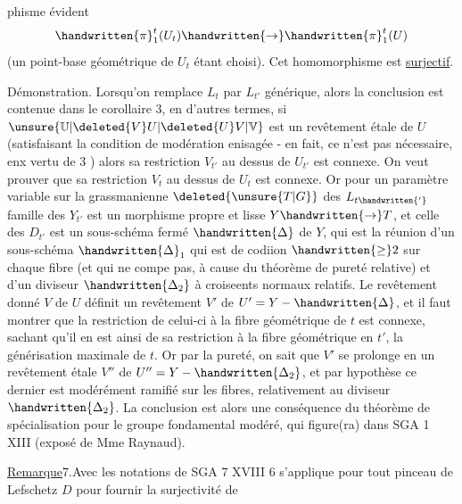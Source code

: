 phisme évident
\[
\handwritten{\pi}_1^t(U_t)\handwritten{\rightarrow}\handwritten{\pi}_1^t(U)
\]
(un point-base géométrique de $U_t$ étant choisi). Cet homomorphisme est \uline{surjectif}.

Démonstration. Lorsqu'on remplace $L_t$ par $L_{t'}$ générique, alors la conclusion est contenue dans le corollaire 3, en d'autres termes, si $\unsure{\mathbb{U}|\deleted{V}U|\deleted{U}V|\mathbb{V}}$ est un revêtement étale  de $U$  (satisfaisant la condition de modération enisagée - en fait, ce n'est pas nécessaire, enx vertu de 3 ) alors sa restriction $V_{t'}$ au dessus de $U_{t'}$ est connexe. On veut prouver que sa restriction $V_t$ au dessus de $U_t$ est  connexe. Or pour un paramètre variable sur  la grassmanienne $\deleted{\unsure{T|G}}$ des $L_{t\handwritten{'}}$\handwritten{,}   famille des $Y_{t'}$ est un morphisme propre et lisse $Y\handwritten{\rightarrow}T$, et celle des $D_{t'}$ est un sous-schéma fermé  $\handwritten{\Delta}$ de $Y$, qui est la réunion d'un sous-schéma $\handwritten{\Delta}_1$ qui est de codiion $\handwritten{\geq}2$ sur chaque fibre (et qui ne compe pas, à cause du théorème de pureté relative) et d'un diviseur $\handwritten{\Delta_2}$ à croiseents normaux relatifs. Le revêtement donné $V$ de $U$ définit un revêtement  $V'$ de $U'=Y-\handwritten{\Delta}$, et il faut montrer que la restriction de celui-ci à la fibre géométrique de $t$ est connexe, sachant qu'il en est ainsi de sa restriction à la fibre géométrique en $t'$, la générisation maximale de $t$. Or par la pureté, on sait que $V'$ se prolonge en un revêtement étale $V''$ de $U''=Y-\handwritten{\Delta_2}$, et par hypothèse ce dernier est modérément ramifié sur les fibres, relativement au diviseur $\handwritten{\Delta_2}$. La conclusion est alors une conséquence du théorème  de spécialisation pour le groupe fondamental modéré, qui figure(ra) dans SGA 1 XIII (exposé de Mme Raynaud).

\uline{Remarque}7.Avec les notations de SGA 7 XVII\deleted{,}I\handwritten{,} 6 s'applique pour tout pinceau de Lefschetz $D$ pour fournir la surjectivité de
